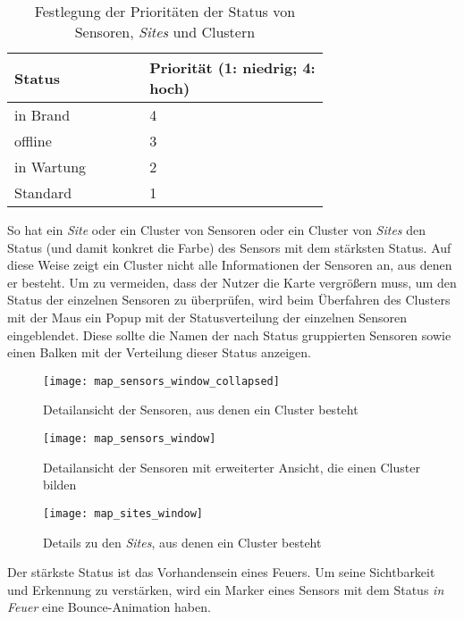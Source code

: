 \begin{table}[H]
  \begin{tabular}{p{0.3\linewidth}|p{0.4\linewidth}}
    \centering
    Status     & Priorität (1: niedrig; 4: hoch) \\ \hline\hline

    in Brand   & 4                               \\\hline
    offline    & 3                               \\\hline
    in Wartung & 2                               \\\hline
    Standard   & 1
  \end{tabular}
  \caption{Festlegung der Prioritäten der Status von Sensoren, \textit{Sites} und Clustern}
\end{table}

So hat ein \textit{Site} oder ein Cluster von Sensoren oder ein Cluster von \textit{Sites} den Status (und damit konkret die Farbe) des Sensors mit dem stärksten Status.
Auf diese Weise zeigt ein Cluster nicht alle Informationen der Sensoren an, aus denen er besteht.
Um zu vermeiden, dass der Nutzer die Karte vergrößern muss, um den Status der einzelnen Sensoren zu überprüfen, wird beim Überfahren des Clusters mit der Maus ein Popup mit der Statusverteilung der einzelnen Sensoren eingeblendet.
Diese sollte die Namen der nach Status gruppierten Sensoren sowie einen Balken mit der Verteilung dieser Status anzeigen.

\begin{figure}[H]
  \centering
  \texttt{[image: map\_sensors\_window\_collapsed]}
  \caption{Detailansicht der Sensoren, aus denen ein Cluster besteht}
  \label{fig:map_sensors_window_collapsed}
\end{figure}
\begin{figure}[H]
  \centering
  \texttt{[image: map\_sensors\_window]}
  \caption{Detailansicht der Sensoren mit erweiterter Ansicht, die einen Cluster bilden}
  \label{fig:map_sensors_window}
\end{figure}
\begin{figure}[H]
  \centering
  \texttt{[image: map\_sites\_window]}
  \caption{Details zu den \textit{Sites}, aus denen ein Cluster besteht}
  \label{fig:map_sites_window}
\end{figure}

Der stärkste Status ist das Vorhandensein eines Feuers.
Um seine Sichtbarkeit und Erkennung zu verstärken, wird ein Marker eines Sensors mit dem Status \textit{in Feuer} eine Bounce-Animation haben.
